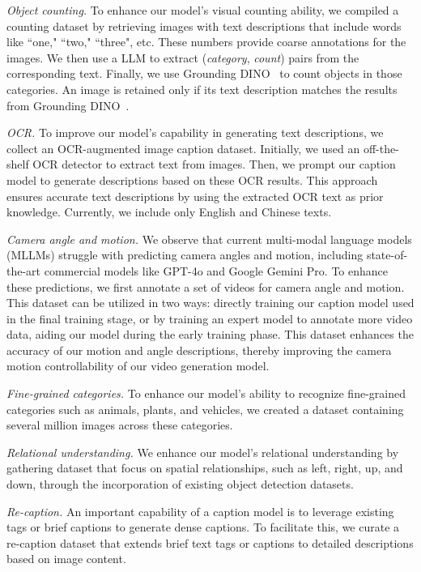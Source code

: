 \emph{Object counting.}
To enhance our model's visual counting ability, we compiled a counting dataset by retrieving images with text descriptions that include words like ``one," ``two," ``three", etc.
These numbers provide coarse annotations for the images.
We then use a LLM to extract (\emph{category}, \emph{count}) pairs from the corresponding text.
Finally, we use Grounding DINO~\citep{groundingdino} to count objects in those categories.
An image is retained only if its text description matches the results from Grounding DINO~\citep{groundingdino}.

\emph{OCR.}
To improve our model's capability in generating text descriptions, we collect an OCR-augmented image caption dataset.
Initially, we used an off-the-shelf OCR detector to extract text from images.
Then, we prompt our caption model to generate descriptions based on these OCR results.
This approach ensures accurate text descriptions by using the extracted OCR text as prior knowledge.
Currently, we include only English and Chinese texts.

\emph{Camera angle and motion.}
We observe that current multi-modal language models (MLLMs) struggle with predicting camera angles and motion, including state-of-the-art commercial models like GPT-4o and Google Gemini Pro.
To enhance these predictions, we first annotate a set of videos for camera angle and motion.
This dataset can be utilized in two ways:
directly training our caption model used in the final training stage,
or by training an expert model to annotate more video data, aiding our model during the early training phase.
This dataset enhances the accuracy of our motion and angle descriptions, thereby improving the camera motion controllability of our video generation model.

\emph{Fine-grained categories.}
To enhance our model's ability to recognize fine-grained categories such as animals, plants, and vehicles, we created a dataset containing several million images across these categories.

\emph{Relational understanding.}
We enhance our model’s relational understanding by gathering dataset that focus on spatial relationships, such as left, right, up, and down, through the incorporation of existing object detection datasets.

\emph{Re-caption.}
An important capability of a caption model is to leverage existing tags or brief captions to generate dense captions.
To facilitate this, we curate a re-caption dataset that extends brief text tags or captions to detailed descriptions based on image content.

